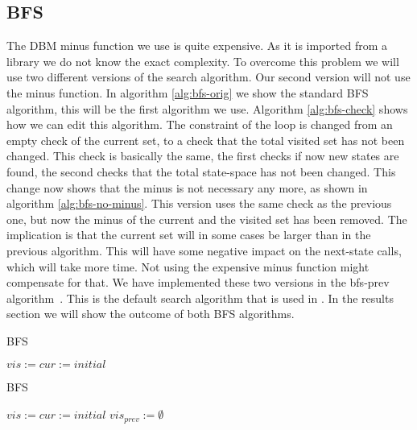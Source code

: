 \subsection{BFS}
\label{subsection:bfs}
The DBM minus function we use is quite expensive. As it is imported from a library we do not know the exact complexity. To overcome this problem we will use two different versions of the search algorithm. Our second version will not use the minus function. In algorithm \ref{alg:bfs-orig} we show the standard BFS algorithm, this will be the first algorithm we use. Algorithm \ref{alg:bfs-check} shows how we can edit this algorithm. The constraint of the loop is changed from an empty check of the current set, to a check that the total visited set has not been changed. This check is basically the same, the first checks if now new states are found, the second checks that the total state-space has not been changed. This change now shows that the minus is not necessary any more, as shown in algorithm \ref{alg:bfs-no-minus}. This version uses the same check as the previous one, but now the minus of the current and the visited set has been removed. The implication is that the current set will in some cases be larger than in the previous algorithm. This will have some negative impact on the next-state calls, which will take more time. Not using the expensive minus function might compensate for that. We have implemented these two versions in the bfs-prev algorithm~\cite{rwcmatrices}. This is the default search algorithm that is used in \ltsmin{}. In the results section we will show the outcome of both BFS algorithms. 

\begin{algorithm}
\caption{BFS}\label{alg:bfs-orig}
\begin{algorithmic}[1]
	\State $vis := cur := initial$
	\EndWhile
	
\EndProcedure	
\end{algorithmic}
\end{algorithm}

\begin{algorithm}
\caption{BFS}\label{alg:bfs-check}
\begin{algorithmic}[1]
	\State $vis := cur := initial$
	\State $vis_{prev} := \emptyset$
	\EndWhile
	
\EndProcedure	
\end{algorithmic}
\end{algorithm}


